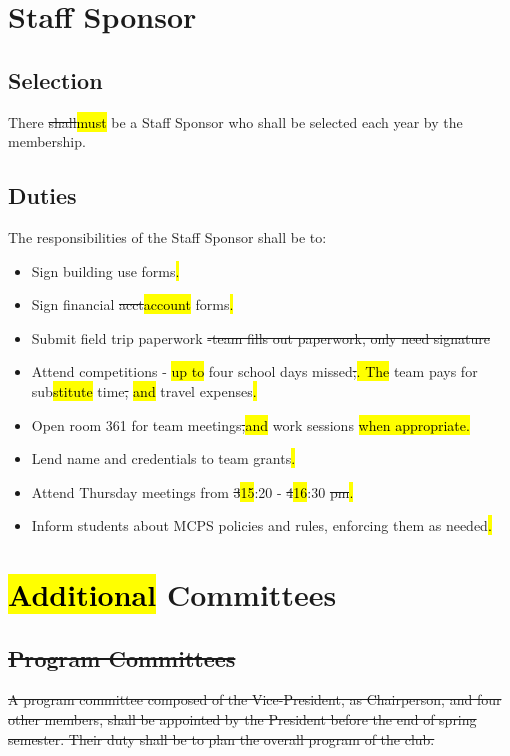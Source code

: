 \documentclass[12pt, a4paper]{article}
\begin{document}
\section{Staff Sponsor}
\subsection{Selection}
There \st{shall}\hl{must} be a Staff Sponsor who shall be selected each year by the membership.
\subsection{Duties}
The responsibilities of the Staff Sponsor shall be to:
\begin{itemize}
\item Sign building use forms\hl{.}
\item Sign financial \st{acct}\hl{account} forms\hl{.}
\item Submit field trip paperwork \st{-team fills out paperwork, only need signature}
\item Attend competitions - \hl{up to }four school days missed\st{;}\hl{. The} team pays for sub\hl{stitute} time\st{,} \hl{and} travel expenses\hl{.}
\item Open room 361 for team meetings\st{,}\hl{and} work sessions\hl{ when appropriate.}
\item Lend name and credentials to team grants\hl{.}
\item Attend Thursday meetings from \st{3}\hl{15}:20 - \st{4}\hl{16}:30 \st{pm}\hl{.}
\item Inform students about MCPS policies and rules, enforcing them as needed\hl{.}
\end{itemize}

\section{\hl{Additional} Committees}
\subsection{\st{Program Committees}}
\st{A program committee composed of the Vice-President, as Chairperson, and four other members, shall be appointed by the President before the end of spring semester. Their duty shall be to plan the overall program of the club.}
\end{document}
